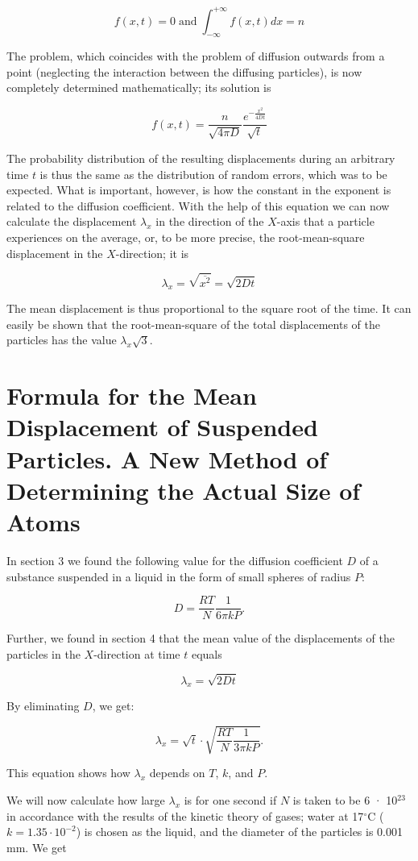\documentclass{article}
\begin{document}
\[f(x,t)= 0 \; \mathrm{and} \; \int^{+\infty}_{-\infty} f(x,t)dx=n\]

The problem, which coincides with the problem of diffusion outwards from a point (neglecting
the interaction between the diffusing particles), is now completely determined mathematically; its
solution is

\[f(x,t) = \frac{n}{\sqrt{4\pi D}} \frac{e^{-\frac{x^{2}}{4Dt}}}{\sqrt{t}} \]

   The probability distribution of the resulting displacements during an arbitrary time $t$ is thus
the same as the distribution of random errors, which was to be expected. What is important,
however, is how the constant in the exponent is related to the diffusion coefficient. With the help
of this equation we can now calculate the displacement $\lambda_{x}$ in the direction of the $X$-axis that a
particle experiences on the average, or, to be more precise, the root-mean-square displacement in
the $X$-direction; it is

\[\lambda_{x} = \sqrt{\overline{x^{2}}} = \sqrt{2Dt} \]

The mean displacement is thus proportional to the square root of the time. It can easily be shown
that the root-mean-square of the total displacements of the particles has the value $\lambda_{x} \sqrt{3}$.

\section{Formula for the Mean Displacement of Suspended Particles. A New Method of  Determining the Actual Size of Atoms}

In section 3 we found the following value for the diffusion coefficient $D$ of a substance suspended
in a liquid in the form of small spheres of radius $P$:

\[D= \frac{RT}{N} \frac{1}{6\pi kP}.\]

\noindent Further, we found in section 4 that the mean value of the displacements of the particles in the
$X$-direction at time $t$ equals

\[\lambda_{x} = \sqrt{2Dt} \]

\noindent By eliminating $D$, we get:

\[\lambda_{x} = \sqrt{t} \cdot \sqrt{\frac{RT}{N} \frac{1}{3\pi kP}}. \]


\noindent This equation shows how $\lambda _{x}$ depends on $T$, $k$, and $P$.

We will now calculate how large $\lambda _{x}$ is for one second if $N$ is taken to be 6 · 10$^{23}$ in accordance
with the results of the kinetic theory of gases; water at 17$^{\circ}$C ($k = 1.35 \cdot 10^{−2}$) is chosen as the
liquid, and the diameter of the particles is 0.001 mm. We get
\end{document}
